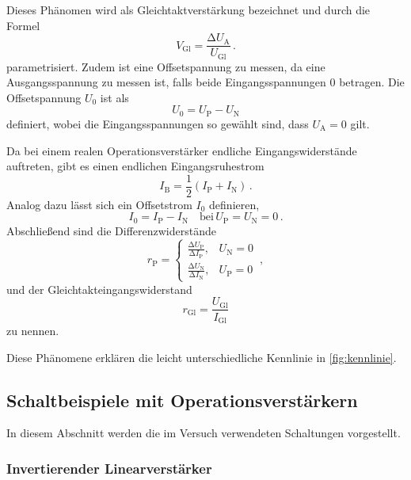Dieses Phänomen wird als Gleichtaktverstärkung bezeichnet und durch die Formel
\begin{equation*}
    V_\text{Gl} = \frac{\increment U_\text{A}}{U_\text{Gl}}\, .
\end{equation*}
parametrisiert. Zudem ist eine Offsetspannung zu messen, da eine Ausgangsspannung zu messen ist, falls beide Eingangsspannungen $0$ betragen. Die Offsetspannung $U_0$ ist als 
\begin{equation*}
    U_0 = U_\text{P} - U_\text{N}
\end{equation*}
definiert, wobei die Eingangsspannungen so gewählt sind, dass $U_\text{A}=0$ gilt.

Da bei einem realen Operationsverstärker endliche Eingangswiderstände auftreten, gibt es einen endlichen Eingangsruhestrom 
\begin{equation*}
    I_\text{B} = \frac{1}{2}\left( I_\text{P} + I_\text{N}\right)\, .
\end{equation*}
Analog dazu lässt sich ein Offsetstrom $I_0$ definieren, 
\begin{equation*}
    I_0 = I_\text{P} - I_\text{N}\quad \text{bei}\, U_\text{P} = U_\text{N}=0\, .
\end{equation*}
Abschließend sind die Differenzwiderstände
\begin{equation*}
    r_\text{P} = \begin{cases}
        \frac{\increment U_\text{P}}{\increment I_\text{P}} , & U_\text{N}=0\\
        \frac{\increment U_\text{N}}{\increment I_\text{N}} , & U_\text{P}=0
    \end{cases}\, ,
\end{equation*}
und der Gleichtakteingangswiderstand 
\begin{equation*}
    r_\text{Gl} = \frac{U_\text{Gl}}{I_\text{Gl}}
\end{equation*}
zu nennen.

Diese Phänomene erklären die leicht unterschiedliche Kennlinie in \autoref{fig:kennlinie}.

\subsection{Schaltbeispiele mit Operationsverstärkern}

\noindent 
In diesem Abschnitt werden die im Versuch verwendeten Schaltungen vorgestellt. 

\subsubsection{Invertierender Linearverstärker}

